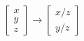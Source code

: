 \documentclass{article}
\begin{document}
\thispagestyle{empty}
$$
\begin{bmatrix}x\\ y\\ z\end{bmatrix} \rightarrow \begin{bmatrix}x/z \\ y/z\end{bmatrix}
$$
\end{document}
